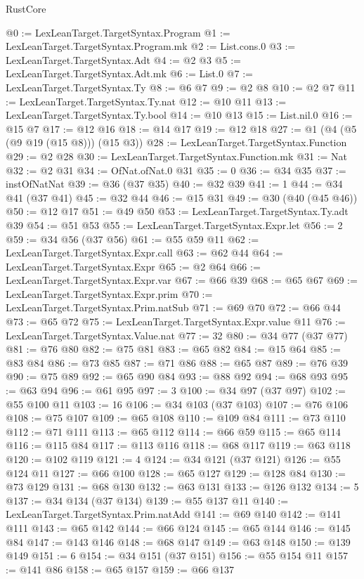 \begin{lexlean}{RustCore}
\begin{coremodule}
@0 := LexLeanTarget.TargetSyntax.Program
@1 := LexLeanTarget.TargetSyntax.Program.mk
@2 := List.cons.{0}
@3 := LexLeanTarget.TargetSyntax.Adt
@4 := @2 @3
@5 := LexLeanTarget.TargetSyntax.Adt.mk
@6 := List.{0}
@7 := LexLeanTarget.TargetSyntax.Ty
@8 := @6 @7
@9 := @2 @8
@10 := @2 @7
@11 := LexLeanTarget.TargetSyntax.Ty.nat
@12 := @10 @11
@13 := LexLeanTarget.TargetSyntax.Ty.bool
@14 := @10 @13
@15 := List.nil.{0}
@16 := @15 @7
@17 := @12 @16
@18 := @14 @17
@19 := @12 @18
@27 := @1 (@4 (@5 (@9 @19 (@15 @8))) (@15 @3))
@28 := LexLeanTarget.TargetSyntax.Function
@29 := @2 @28
@30 := LexLeanTarget.TargetSyntax.Function.mk
@31 := Nat
@32 := @2 @31
@34 := OfNat.ofNat.{0} @31
@35 := 0
@36 := @34 @35
@37 := instOfNatNat
@39 := @36 (@37 @35)
@40 := @32 @39
@41 := 1
@44 := @34 @41 (@37 @41)
@45 := @32 @44
@46 := @15 @31
@49 := @30 (@40 (@45 @46))
@50 := @12 @17
@51 := @49 @50
@53 := LexLeanTarget.TargetSyntax.Ty.adt @39
@54 := @51 @53
@55 := LexLeanTarget.TargetSyntax.Expr.let
@56 := 2
@59 := @34 @56 (@37 @56)
@61 := @55 @59 @11
@62 := LexLeanTarget.TargetSyntax.Expr.call
@63 := @62 @44
@64 := LexLeanTarget.TargetSyntax.Expr
@65 := @2 @64
@66 := LexLeanTarget.TargetSyntax.Expr.var
@67 := @66 @39
@68 := @65 @67
@69 := LexLeanTarget.TargetSyntax.Expr.prim
@70 := LexLeanTarget.TargetSyntax.Prim.natSub
@71 := @69 @70
@72 := @66 @44
@73 := @65 @72
@75 := LexLeanTarget.TargetSyntax.Expr.value @11
@76 := LexLeanTarget.TargetSyntax.Value.nat
@77 := 32
@80 := @34 @77 (@37 @77)
@81 := @76 @80
@82 := @75 @81
@83 := @65 @82
@84 := @15 @64
@85 := @83 @84
@86 := @73 @85
@87 := @71 @86
@88 := @65 @87
@89 := @76 @39
@90 := @75 @89
@92 := @65 @90 @84
@93 := @88 @92
@94 := @68 @93
@95 := @63 @94
@96 := @61 @95
@97 := 3
@100 := @34 @97 (@37 @97)
@102 := @55 @100 @11
@103 := 16
@106 := @34 @103 (@37 @103)
@107 := @76 @106
@108 := @75 @107
@109 := @65 @108
@110 := @109 @84
@111 := @73 @110
@112 := @71 @111
@113 := @65 @112
@114 := @66 @59
@115 := @65 @114
@116 := @115 @84
@117 := @113 @116
@118 := @68 @117
@119 := @63 @118
@120 := @102 @119
@121 := 4
@124 := @34 @121 (@37 @121)
@126 := @55 @124 @11
@127 := @66 @100
@128 := @65 @127
@129 := @128 @84
@130 := @73 @129
@131 := @68 @130
@132 := @63 @131
@133 := @126 @132
@134 := 5
@137 := @34 @134 (@37 @134)
@139 := @55 @137 @11
@140 := LexLeanTarget.TargetSyntax.Prim.natAdd
@141 := @69 @140
@142 := @141 @111
@143 := @65 @142
@144 := @66 @124
@145 := @65 @144
@146 := @145 @84
@147 := @143 @146
@148 := @68 @147
@149 := @63 @148
@150 := @139 @149
@151 := 6
@154 := @34 @151 (@37 @151)
@156 := @55 @154 @11
@157 := @141 @86
@158 := @65 @157
@159 := @66 @137

\end{coremodule}
\end{lexlean}
